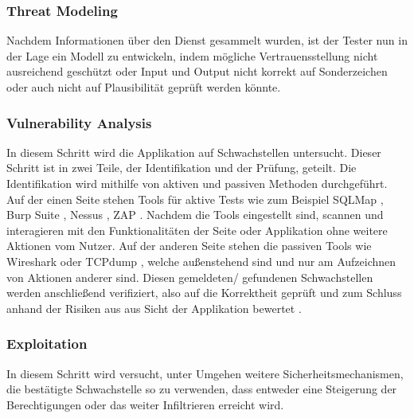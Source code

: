     \subsubsection{\glqq Threat Modeling\grqq{}}
        Nachdem Informationen über den Dienst gesammelt wurden, ist der Tester nun in der Lage ein Modell zu entwickeln, indem mögliche Vertrauensstellung nicht ausreichend geschützt oder Input und Output nicht korrekt auf Sonderzeichen oder auch nicht auf Plausibilität geprüft werden könnte. 
    \subsubsection{\glqq Vulnerability Analysis\grqq{}}
        In diesem Schritt wird die Applikation auf Schwachstellen untersucht. 
        Dieser Schritt ist in zwei Teile, der Identifikation und der Prüfung, geteilt.
        Die Identifikation wird mithilfe von aktiven und passiven Methoden durchgeführt.
        Auf der einen Seite stehen Tools für aktive Tests wie zum Beispiel 
        SQLMap \cite{damele_stampar_2014}, 
        Burp Suite \cite{LozanoCarlosA.author2019Hapt}, %
        Nessus \cite{BealeJay2008Nna}, %
        \ac{ZAP} \cite{bennetts2013owasp}. %
        Nachdem die Tools eingestellt sind, scannen und interagieren mit den Funktionalitäten der Seite oder Applikation ohne weitere Aktionen vom Nutzer.
        Auf der anderen Seite stehen die passiven Tools wie Wireshark oder TCPdump \cite{tcpdump_2010}, welche außenstehend sind und nur am Aufzeichnen von Aktionen anderer sind. 
        Diesen gemeldeten/ gefundenen Schwachstellen werden anschließend verifiziert, also auf die Korrektheit geprüft und zum Schluss anhand der Risiken aus aus Sicht der Applikation bewertet \cite{hayes_2012}.
    \subsubsection{\glqq Exploitation\grqq{}}
        In diesem Schritt wird versucht, unter Umgehen weitere Sicherheitsmechanismen, die bestätigte Schwachstelle so zu verwenden, dass entweder eine Steigerung der Berechtigungen oder das weiter Infiltrieren erreicht wird.
